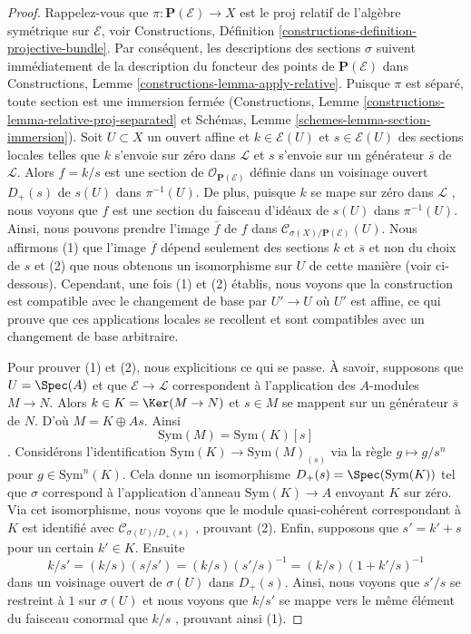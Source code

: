 \begin{proof}
Rappelez-vous que  $\pi : \mathbf{P}(\mathcal{E}) \to X$  est le proj relatif de l'algèbre symétrique sur
 $\mathcal{E}$, voir Constructions, Définition  \ref{constructions-definition-projective-bundle}. Par conséquent, les
descriptions des sections  $\sigma$  suivent immédiatement de la description du
foncteur des points de  $\mathbf{P}(\mathcal{E})$  dans Constructions, Lemme  \ref{constructions-lemma-apply-relative}.
Puisque  $\pi$  est séparé, toute section est une immersion fermée
(Constructions, Lemme  \ref{constructions-lemma-relative-proj-separated}  et Schémas, Lemme  \ref{schemes-lemma-section-immersion}). Soit
 $U \subset X$  un ouvert affine et  $k \in \mathcal{E}(U)$  et  $s \in \mathcal{E}(U)$  des sections locales
telles que  $k$  s'envoie sur zéro dans  $\mathcal{L}$  et  $s$ 
s'envoie sur un générateur  $\overline{s}$  de  $\mathcal{L}$. Alors  $f = k/s$  est
une section de  $\mathcal{O}_{\mathbf{P}(\mathcal{E})}$  définie dans un voisinage ouvert  $D_+(s)$  de
 $s(U)$  dans  $\pi^{-1}(U)$. De plus, puisque  $k$  se mape sur zéro
dans  $\mathcal{L}$ , nous voyons que  $f$  est une section du faisceau
d'idéaux de  $s(U)$  dans  $\pi^{-1}(U)$. Ainsi, nous pouvons prendre l'image
 $\overline{f}$  de  $f$  dans  $\mathcal{C}_{\sigma(X)/\mathbf{P}(\mathcal{E})}(U)$. Nous affirmons (1) que l'image
 $\overline{f}$  dépend seulement des sections  $k$  et  $\overline{s}$  et non du
choix de  $s$  et (2) que nous obtenons un isomorphisme sur  $U$  de
cette manière (voir ci-dessous). Cependant, une fois (1) et (2) établis, nous
voyons que la construction est compatible avec le changement de base par
 $U' \to U$  où  $U'$  est affine, ce qui prouve que ces applications
locales se recollent et sont compatibles avec un changement de base arbitraire.

\medskip\noindent
Pour prouver (1) et (2), nous explicitions ce qui se passe. À savoir, supposons
que  $U = \Spec(A)$  et que  $\mathcal{E} \to \mathcal{L}$  correspondent à l'application des
 $A$-modules  $M \to N$. Alors  $k \in K = \Ker(M \to N)$  et  $s \in M$  se mappent
sur un générateur  $\overline{s}$  de  $N$. D'où  $M = K \oplus A s$. Ainsi
$$
\text{Sym}(M) = \text{Sym}(K)[s]
$$
. Considérons l'identification  $\text{Sym}(K) \to \text{Sym}(M)_{(s)}$  via la règle  $g \mapsto g/s^n$  pour
 $g \in \text{Sym}^n(K)$. Cela donne un isomorphisme  $D_+(s) = \Spec(\text{Sym}(K))$  tel que  $\sigma$ 
correspond à l'application d'anneau  $\text{Sym}(K) \to A$  envoyant  $K$  sur zéro.
Via cet isomorphisme, nous voyons que le module quasi-cohérent correspondant à
 $K$  est identifié avec  $\mathcal{C}_{\sigma(U)/D_+(s)}$ , prouvant (2). Enfin, supposons que
 $s' = k' + s$  pour un certain  $k' \in K$. Ensuite
$$
k/s' = (k/s) (s/s') = (k/s) (s'/s)^{-1} = (k/s) (1 + k'/s)^{-1}
$$
dans un voisinage ouvert de  $\sigma(U)$  dans  $D_+(s)$. Ainsi, nous voyons que
 $s'/s$  se restreint à  $1$  sur  $\sigma(U)$  et nous voyons que
 $k/s'$  se mappe vers le même élément du faisceau conormal que  $k/s$ ,
prouvant ainsi (1).
\end{proof}





